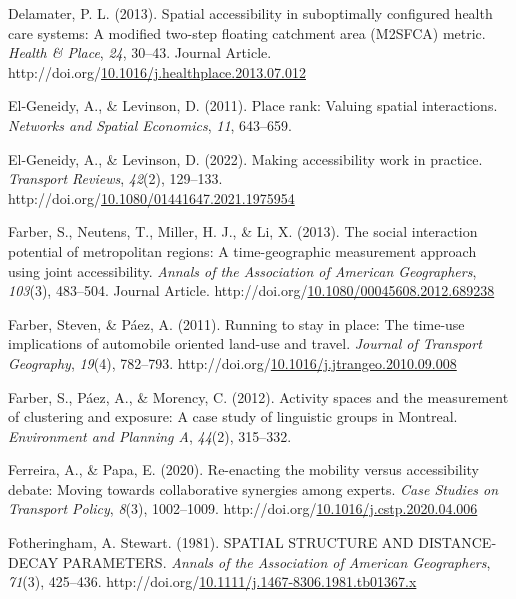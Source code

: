 \documentclass[
11pt, %
oneside, %
english, %
singlespacing, %
]{macthesis} %
\newlength{\cslhangindent}
\newenvironment{CSLReferences}[2] %
{\begin{list}{}{%
	\setlength{\itemindent}{0pt}
	\setlength{\leftmargin}{0pt}
	\setlength{\parsep}{0pt}
	\ifodd #1
	\setlength{\leftmargin}{\cslhangindent}
	\setlength{\itemindent}{-1\cslhangindent}
	\fi
	\setlength{\itemsep}{#2\baselineskip}}}
{\end{list}}
\begin{document}
\begin{CSLReferences}{1}{0}
Delamater, P. L. (2013). Spatial accessibility in suboptimally configured health care systems: A modified two-step floating catchment area (M2SFCA) metric. \emph{Health \& Place}, \emph{24}, 30--43. Journal Article. http://doi.org/\href{https://doi.org/10.1016/j.healthplace.2013.07.012}{10.1016/j.healthplace.2013.07.012}

El-Geneidy, A., \& Levinson, D. (2011). Place rank: Valuing spatial interactions. \emph{Networks and Spatial Economics}, \emph{11}, 643--659.

El-Geneidy, A., \& Levinson, D. (2022). Making accessibility work in practice. \emph{Transport Reviews}, \emph{42}(2), 129--133. http://doi.org/\href{https://doi.org/10.1080/01441647.2021.1975954}{10.1080/01441647.2021.1975954}

Farber, S., Neutens, T., Miller, H. J., \& Li, X. (2013). The social interaction potential of metropolitan regions: A time-geographic measurement approach using joint accessibility. \emph{Annals of the Association of American Geographers}, \emph{103}(3), 483--504. Journal Article. http://doi.org/\href{https://doi.org/10.1080/00045608.2012.689238}{10.1080/00045608.2012.689238}

Farber, Steven, \& Páez, A. (2011). Running to stay in place: The time-use implications of automobile oriented land-use and travel. \emph{Journal of Transport Geography}, \emph{19}(4), 782--793. http://doi.org/\href{https://doi.org/10.1016/j.jtrangeo.2010.09.008}{10.1016/j.jtrangeo.2010.09.008}

Farber, S., Páez, A., \& Morency, C. (2012). Activity spaces and the measurement of clustering and exposure: A case study of linguistic groups in {Montreal}. \emph{Environment and Planning A}, \emph{44}(2), 315--332.

Ferreira, A., \& Papa, E. (2020). Re-enacting the mobility versus accessibility debate: Moving towards collaborative synergies among experts. \emph{Case Studies on Transport Policy}, \emph{8}(3), 1002--1009. http://doi.org/\href{https://doi.org/10.1016/j.cstp.2020.04.006}{10.1016/j.cstp.2020.04.006}

Fotheringham, A. Stewart. (1981). {SPATIAL} {STRUCTURE} {AND} {DISTANCE}‐{DECAY} {PARAMETERS}. \emph{Annals of the Association of American Geographers}, \emph{71}(3), 425--436. http://doi.org/\href{https://doi.org/10.1111/j.1467-8306.1981.tb01367.x}{10.1111/j.1467-8306.1981.tb01367.x}


\end{CSLReferences}
\end{document}
